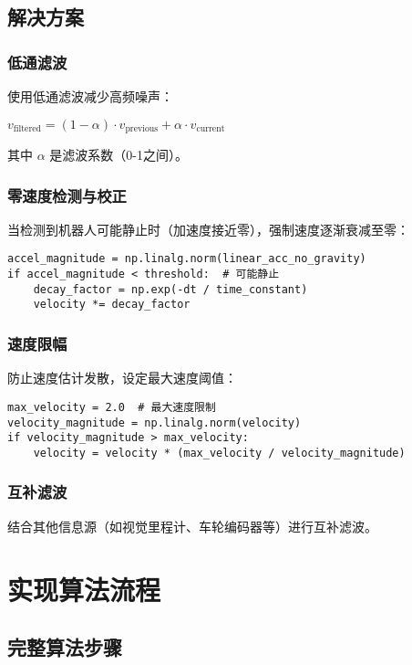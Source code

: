 \documentclass[12pt,a4paper]{article}
\begin{document}
\subsection{解决方案}

\subsubsection{低通滤波}

使用低通滤波减少高频噪声：

$v_{\text{filtered}} = (1 - \alpha) \cdot v_{\text{previous}} + \alpha \cdot v_{\text{current}}$

其中 $\alpha$ 是滤波系数（0-1之间）。

\subsubsection{零速度检测与校正}

当检测到机器人可能静止时（加速度接近零），强制速度逐渐衰减至零：

\begin{lstlisting}
accel_magnitude = np.linalg.norm(linear_acc_no_gravity)
if accel_magnitude < threshold:  # 可能静止
    decay_factor = np.exp(-dt / time_constant)
    velocity *= decay_factor
\end{lstlisting}

\subsubsection{速度限幅}

防止速度估计发散，设定最大速度阈值：

\begin{lstlisting}
max_velocity = 2.0  # 最大速度限制
velocity_magnitude = np.linalg.norm(velocity)
if velocity_magnitude > max_velocity:
    velocity = velocity * (max_velocity / velocity_magnitude)
\end{lstlisting}

\subsubsection{互补滤波}

结合其他信息源（如视觉里程计、车轮编码器等）进行互补滤波。

\section{实现算法流程}

\subsection{完整算法步骤}
\end{document}
